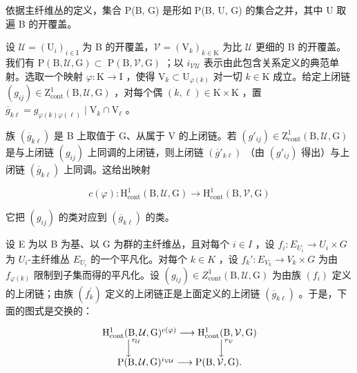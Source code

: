 依据主纤维丛的定义，集合 P(B, G) 是形如 P(B, U, G) 的集合之并，其中 U 取遍 B 的开覆盖。

设 \(\mathcal{U} = (\mathrm{U}_i)_{i\in \mathrm{I}}\) 为 B 的开覆盖，\(\mathcal{V} = (\mathrm{V}_k)_{k\in \mathrm{K}}\) 为比 \(\mathcal{U}\) 更细的 B 的开覆盖。我们有 \(\mathrm{P(B,\mathcal{U},G)}\subset\) \(\mathrm{P(B,\mathcal{V},G)}\) ；以 \(i_{\mathcal{V}\mathcal{U}}\) 表示由此包含关系定义的典范单射。选取一个映射 \(\varphi \colon \mathrm{K}\to \mathrm{I}\) ，使得 \(\mathrm{V}_k\subset \mathrm{U}_{\varphi (k)}\) 对一切 \(k\in \mathrm{K}\) 成立。给定上闭链 \((g_{ij})\in \mathrm{Z}_{\mathrm{cont}}^1 (\mathrm{B},\mathcal{U},\mathrm{G})\) ，对每个偶 \((k,\ell)\in \mathrm{K}\times \mathrm{K}\) ，置 \(\overline{g}_{k\ell} = g_{\varphi (k)\varphi (\ell)}\mid \mathrm{V}_k\cap \mathrm{V}_\ell\) 。

族 \((\overline{g}_{k\ell})\) 是 B 上取值于 G、从属于 V 的上闭链。若 \((g'_{ij}) \in \mathrm{Z}_{\mathrm{cont}}^{1}(\mathrm{B}, \mathcal{U}, \mathrm{G})\) 是与上闭链 \((g_{ij})\) 上同调的上闭链，则上闭链 \((\overline{g}'_{k\ell})\) （由 \((g'_{ij})\) 得出）与上闭链 \((\overline{g}_{k\ell})\) 上同调。这给出映射

\[
c (\varphi) \colon \mathrm{H} _ {\mathrm{cont}} ^ {1} (\mathrm{B}, \mathcal {U}, \mathrm{G}) \to \mathrm{H} _ {\mathrm{cont}} ^ {1} (\mathrm{B}, \mathcal {V}, \mathrm{G})
\]

它把 \((g_{ij})\) 的类对应到 \((\overline{g}_{k\ell})\) 的类。

设 E 为以 B 为基、以 G 为群的主纤维丛，且对每个 \(i \in I\) ，设 \(f_i: E_{U_i} \to U_i \times G\) 为 \(U_i\)-主纤维丛 \(E_{U_i}\) 的一个平凡化。对每个 \(k \in K\) ，设 \(f_k' : E_{V_k} \to V_k \times G\) 为由 \(f_{\varphi(k)}\) 限制到子集而得的平凡化。设 \((g_{ij}) \in Z_{\mathrm{cont}}^1(\mathrm{B}, \mathcal{U}, \mathrm{G})\) 为由族 \((f_i)\) 定义的上闭链；由族 \((f_{k}^{\prime})\) 定义的上闭链正是上面定义的上闭链 \((\overline{g}_{k\ell})\) 。于是，下面的图式是交换的：

\[
\begin{array}{c} \mathrm{H} _ {\mathrm{cont}} ^ {1} (\mathrm{B}, \mathcal {U}, \mathrm{G}) ^ {c (\varphi)} \longrightarrow \mathrm{H} _ {\mathrm{cont}} ^ {1} (\mathrm{B}, \mathcal {V}, \mathrm{G}) \\ \Big \downarrow^ {r _ {\mathcal {U}}} \qquad \qquad \qquad \qquad \Big \downarrow^ {r _ {\mathcal {V}}} \\ \mathrm{P} (\mathrm{B}, \mathcal {U}, \mathrm{G}) ^ {i _ {\mathcal {V} \mathcal {U}}} \longrightarrow \mathrm{P} (\mathrm{B}, \mathcal {V}, \mathrm{G}). \end{array}
\]

